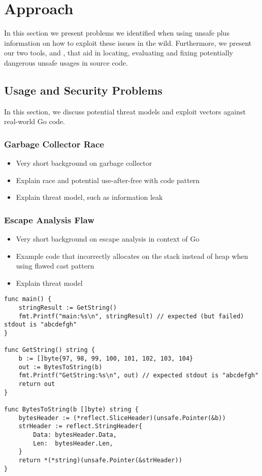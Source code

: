 \section{Approach}
\label{sec:impl}
In this section we present problems we identified when using unsafe plus information on how to exploit these issues in the wild.
Furthermore, we present our two tools, \toolUsage{} and \toolSA{}, that aid in locating, evaluating and fixing potentially dangerous unsafe usages in source code.

\subsection{Usage and Security Problems}
In this section, we discuss potential threat models and exploit vectors against real-world \unsafe{} Go code.

\subsubsection*{Garbage Collector Race}

\begin{itemize}
    \item Very short background on garbage collector
    \item Explain race and potential use-after-free with code pattern
    \item Explain threat model, such as information leak
\end{itemize}


\subsubsection*{Escape Analysis Flaw}

\begin{itemize}
    \item Very short background on escape analysis in context of Go
    \item Example code that incorrectly allocates on the stack instead of heap when using flawed cast pattern
    \item Explain threat model
\end{itemize}

\begin{lstlisting}
func main() {
	stringResult := GetString()
	fmt.Printf("main:%s\n", stringResult) // expected (but failed) stdout is "abcdefgh"
}

func GetString() string {
	b := []byte{97, 98, 99, 100, 101, 102, 103, 104}
	out := BytesToString(b)
	fmt.Printf("GetString:%s\n", out) // expected stdout is "abcdefgh"
	return out
}

func BytesToString(b []byte) string {
	bytesHeader := (*reflect.SliceHeader)(unsafe.Pointer(&b))
	strHeader := reflect.StringHeader{
		Data: bytesHeader.Data,
		Len:  bytesHeader.Len,
	}
	return *(*string)(unsafe.Pointer(&strHeader))
}
\end{lstlisting}


